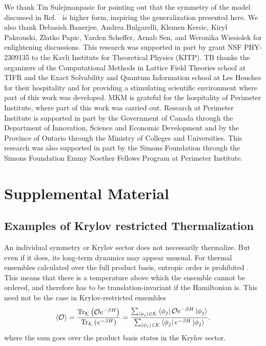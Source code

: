 \documentclass[
 reprint,
 amsmath,amssymb,
 aps,floatfix,prl,superscriptaddress
]{revtex4-2}
\begin{document}
We thank Tin Sulejmanpasic for pointing out that the symmetry of the model discussed in Ref.~\cite{Khudorozhkov:2021oig} is higher form, inspiring the generalization presented here. We also thank Debasish Banerjee, Andrea Bulgarelli, Klemen Kersic, Kiryl Pakrouski, Zlatko
Papic, Yarden Scheffer, Arnab Sen, and Weronika Wiesiolek for enlightening
discussions. This research was supported in part by grant NSF PHY-2309135 to the Kavli Institute
for Theoretical Physics (KITP). TB thanks the organizers of the Computational Methods in Lattice Field Theories school at TIFR and the Exact Solvability and Quantum Information school at Les Houches for their hospitality and for providing a stimulating scientific environment where part of this work was developed. MKM is grateful for the hospitality of Perimeter Institute, where part
of this work was carried out. Research at Perimeter Institute is supported in part by the Government
of Canada through the Department of Innovation, Science and Economic Development and by
the Province of Ontario through the Ministry of Colleges and Universities. This research was also
supported in part by the Simons Foundation through the Simons Foundation Emmy Noether Fellows
Program at Perimeter Institute. 




\section{Supplemental Material}

\subsection{Examples of Krylov restricted Thermalization}


An individual symmetry or Krylov sector does not necessarily thermalize. But even if it does, its long-term dynamics may appear unusual. 
For thermal ensembles calculated over the full product basis, entropic order is prohibited \cite{Han:2025eiw}. This means that there is a temperature above which the ensemble cannot be ordered, and therefore has to be translation-invariant if the Hamiltonian is. 
This need not be the case in Krylov-restricted ensembles
\begin{equation}
    \langle\mathcal{O}\rangle = \frac{\mathrm{Tr}_\mathcal{K}\left(\mathcal{O}e^{-\beta H}\right)}{\mathrm{Tr}_\mathcal{K}\left(e^{-\beta H}\right)} = \frac{\sum_{\ket{\phi_j}\in\mathcal{K}} \bra{\phi_j}\mathcal{O}e^{-\beta H}\ket{\phi_j}}{\sum_{\ket{\phi_j}\in\mathcal{K}} \bra{\phi_j}e^{-\beta H}\ket{\phi_j}}.
\end{equation}
where the sum goes over the product basis states in the Krylov sector.
\end{document}
